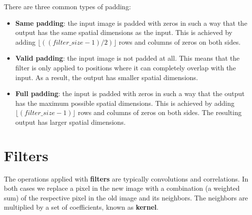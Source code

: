 \documentclass{article}
\begin{document}
There are three common types of padding:

\begin{itemize}
    \item \textbf{Same padding}: the input image is padded with zeros in such a way that the output has the same spatial dimensions as the input. This is achieved by adding $\lfloor((filter\_size - 1) / 2)\rfloor$ rows and columns of zeros on both sides.
    \item \textbf{Valid padding}: the input image is not padded at all. This means that the filter is only applied to positions where it can completely overlap with the input. As a result, the output has smaller spatial dimensions.    
    \item \textbf{Full padding}: the input is padded with zeros in such a way that the output has the maximum possible spatial dimensions. This is achieved by adding $\lfloor(filter\_size - 1)\rfloor$ rows and columns of zeros on both sides. The resulting output has larger spatial dimensions.
\end{itemize}

\newpage

\section*{Filters}

The operations applied with \textbf{filters} are typically convolutions and correlations. In both cases we replace a pixel in the new image with a combination (a weighted sum) of the respective pixel in the old image and its neighbors. The neighbors are multiplied by a set of coefficients, known as \textbf{kernel}. \\

\vspace{0.5cm}
\end{document}
